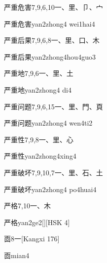 \begin{Entry}{严重危害}{7,9,6,10}{⼀、⾥、⼙、⼧}
  \begin{Phonetics}{严重危害}{yan2zhong4 wei1hai4}
  \end{Phonetics}
\end{Entry}

\begin{Entry}{严重后果}{7,9,6,8}{⼀、⾥、⼝、⽊}
  \begin{Phonetics}{严重后果}{yan2zhong4hou4guo3}
  \end{Phonetics}
\end{Entry}

\begin{Entry}{严重地}{7,9,6}{⼀、⾥、⼟}
  \begin{Phonetics}{严重地}{yan2zhong4 di4}
  \end{Phonetics}
\end{Entry}

\begin{Entry}{严重问题}{7,9,6,15}{⼀、⾥、⾨、⾴}
  \begin{Phonetics}{严重问题}{yan2zhong4 wen4ti2}
  \end{Phonetics}
\end{Entry}

\begin{Entry}{严重性}{7,9,8}{⼀、⾥、⼼}
  \begin{Phonetics}{严重性}{yan2zhong4xing4}
  \end{Phonetics}
\end{Entry}

\begin{Entry}{严重破坏}{7,9,10,7}{⼀、⾥、⽯、⼟}
  \begin{Phonetics}{严重破坏}{yan2zhong4 po4huai4}
  \end{Phonetics}
\end{Entry}

\begin{Entry}{严格}{7,10}{⼀、⽊}
  \begin{Phonetics}{严格}{yan2ge2}[][HSK 4]
  \end{Phonetics}
\end{Entry}

\begin{Entry}{靣}{8}{⼀}[Kangxi 176]
  \begin{Phonetics}{靣}{mian4}
  \end{Phonetics}
\end{Entry}


